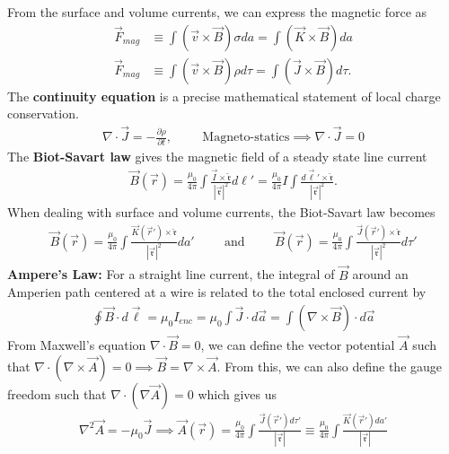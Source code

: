 From the surface and volume currents, we can express the magnetic force as
\begin{align}
	\vec{F}_{mag} &\equiv \int (\vec{v}\times \vec{B})\sigma da = \int (\vec{K}\times \vec{B})da \\
	\vec{F}_{mag} &\equiv \int (\vec{v}\times \vec{B})\rho d\tau = \int (\vec{J}\times \vec{B})d\tau.
\end{align} 
The \textbf{continuity equation} is a precise mathematical statement of local charge conservation.
\begin{align}
	\nabla \cdot \vec{J} = -\frac{\partial \rho}{\partial t}, \hspace{1cm}\textrm{Magneto-statics} \implies \nabla \cdot \vec{J} = 0 
\end{align}
The \textbf{Biot-Savart law} gives the magnetic field of a steady state line current
\begin{align}
	\vec{B}(\vec{r})=\frac{\mu_0}{4\pi}\int \frac{\vec{I}\times \mathfrak{\hat{r}}}{|\vec{\mathfrak{r}}|^2}d\ell' =\frac{\mu_0}{4\pi}I\int \frac{d\vec{\ell}'\times \mathfrak{\hat{r}}}{|\vec{\mathfrak{r}}|^2}. 
\end{align}
When dealing with surface and volume currents, the Biot-Savart law becomes
\begin{align}
	\vec{B}(\vec{r})=\frac{\mu_0}{4\pi}\int \frac{\vec{K}(\vec{r}')\times \mathfrak{\hat{r}}}{|\vec{\mathfrak{r}}|^2}da'\hspace{1cm}\textrm{and}\hspace{1cm}\vec{B}(\vec{r})=\frac{\mu_0}{4\pi}\int \frac{\vec{J}(\vec{r}')\times \mathfrak{\hat{r}}}{|\vec{\mathfrak{r}}|^2}d\tau'
\end{align}
\textbf{Ampere's Law:} For a straight line current, the integral of $\vec{B}$ around an Amperien path centered at a wire is related to the total enclosed current by
\begin{align}
	\oint\vec{B}\cdot d\vec{\ell} = \mu_0 I_{enc} = \mu_0 \int \vec{J} \cdot d\vec{a} = \int (\nabla \times \vec{B})\cdot d\vec{a}
\end{align}
From Maxwell's equation $\nabla \cdot \vec{B}=0$, we can define the vector potential $\vec{A}$ such that $\nabla \cdot (\nabla \times \vec{A}) = 0 \implies \vec{B} = \nabla \times \vec{A}$. From this, we can also define the gauge freedom such that $\nabla \cdot (\nabla \vec{A})=0$ which gives us
\begin{align}
	\nabla^2\vec{A} = -\mu_0 \vec{J} \implies \vec{A}(\vec{r}) = \frac{\mu_0}{4\pi}\int \frac{\vec{J}(\vec{r}')d\tau'}{|\vec{\mathfrak{r}}|} \equiv \frac{\mu_0}{4\pi}\int \frac{\vec{K}(\vec{r}')da'}{|\vec{\mathfrak{r}}|}
\end{align}
